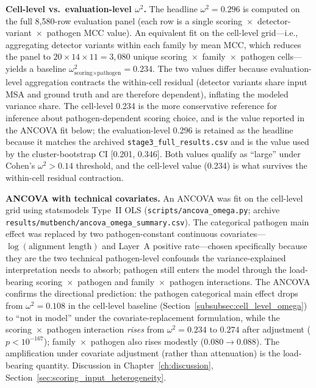\textbf{Cell-level vs.\ evaluation-level $\omega^2$.}\label{subsubsec:cell_level_omega} The headline $\omega^2 = 0.296$ is computed on the full 8{,}580-row evaluation panel (each row is a single scoring~$\times$~detector-variant~$\times$~pathogen MCC value). An equivalent fit on the cell-level grid---i.e., aggregating detector variants within each family by mean MCC, which reduces the panel to $20 \times 14 \times 11 = 3{,}080$ unique scoring~$\times$~family~$\times$~pathogen cells---yields a baseline $\omega^2_{\text{scoring} \times \text{pathogen}} = 0.234$. The two values differ because evaluation-level aggregation contracts the within-cell residual (detector variants share input MSA and ground truth and are therefore dependent), inflating the modeled variance share. The cell-level 0.234 is the more conservative reference for inference about pathogen-dependent scoring choice, and is the value reported in the ANCOVA fit below; the evaluation-level 0.296 is retained as the headline because it matches the archived \texttt{stage3\_full\_results.csv} and is the value used by the cluster-bootstrap CI [0.201, 0.346]. Both values qualify as ``large'' under Cohen's $\omega^2 > 0.14$ threshold, and the cell-level value (0.234) is what survives the within-cell residual contraction.

\textbf{ANCOVA with technical covariates.}\label{subsubsec:ancova_methods} An ANCOVA was fit on the cell-level grid using statsmodels Type~II OLS (\texttt{scripts/ancova\_omega.py}; archive \texttt{results/mutbench/ancova\_omega\_summary.csv}). The categorical pathogen main effect was replaced by two pathogen-constant continuous covariates---$\log(\text{alignment length})$ and Layer~A positive rate---chosen specifically because they are the two technical pathogen-level confounds the variance-explained interpretation needs to absorb; pathogen still enters the model through the load-bearing scoring~$\times$~pathogen and family~$\times$~pathogen interactions. The ANCOVA confirms the directional prediction: the pathogen categorical main effect drops from $\omega^2 = 0.108$ in the cell-level baseline (Section~\ref{subsubsec:cell_level_omega}) to ``not in model'' under the covariate-replacement formulation, while the scoring~$\times$~pathogen interaction \emph{rises} from $\omega^2 = 0.234$ to $0.274$ after adjustment ($p < 10^{-167}$); family~$\times$~pathogen also rises modestly ($0.080 \to 0.088$). The amplification under covariate adjustment (rather than attenuation) is the load-bearing quantity. Discussion in Chapter~\ref{ch:discussion}, Section~\ref{sec:scoring_input_heterogeneity}.

